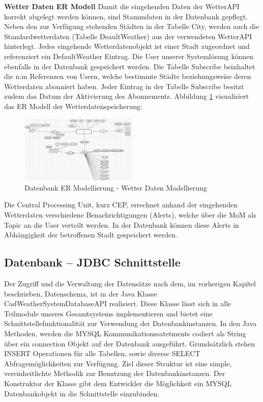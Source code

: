 \textbf{Wetter Daten ER Modell}
Damit die eingehenden Daten der WetterAPI  korrekt abgelegt werden können, sind Stammdaten in der Datenbank gepflegt. Neben den zur Verfügung stehenden Städten in der Tabelle City, werden auch die Standardwetterdaten (Tabelle DeaultWeather) aus der verwendeten WetterAPI hinterlegt. Jedes eingehende  Wetterdatenobjekt ist einer Stadt zugeordnet und referenziert ein DefaultWeather Eintrag.
Die User unserer Systemlösung können ebenfalls in der Datenbank gespeichert werden. Die Tabelle Subscribe beinhaltet die n:m Referenzen von Usern, welche bestimmte Städte beziehungsweise deren Wetterdaten abonniert haben. Jeder Eintrag in der Tabelle Subscribe besitzt zudem das Datum der Aktivierung des Abonnements. Abbildung \ref{img:DBSchemaWetterDaten} visualisiert das ER Modell der Wetterdatenspeicherung:
\begin{figure}[htbp]
	\centering
	\includegraphics[width=0.5\textwidth]{Bilder/DBWetterDaten.png}
	\caption{Datenbank ER Modellierung - Wetter Daten Modellierung}
	\label{img:DBSchemaWetterDaten}
\end{figure} 
Die Central Processing Unit, kurz CEP, errechnet anhand der eingehenden Wetterdaten verschiedene Benachrichtigungen (Alerts), welche über die MoM als Topic an die User verteilt werden. In der Datenbank können diese Alerts in Abhängigkeit der betroffenen Stadt gespeichert werden.

\subsection{Datenbank – JDBC Schnittstelle}
Der Zugriff und die Verwaltung der Datensätze nach dem, im vorherigen Kapitel beschrieben, Datenschema, ist in der Java Klasse  CadWeatherSystemDatabaseAPI realisiert. Diese Klasse lässt sich in alle Teilmodule unseres Gesamtsystems implementieren und bietet eine Schnittstellefunktionalität zur Verwendung der Datenbankinstanzen. In den Java Methoden, werden die MYSQL Kommunikationssatetments codiert als String über ein connection Objekt auf der Datenbank ausgeführt. Grundsätzlich stehen INSERT Operationen für alle Tabellen, sowie diverse SELECT Abfragemöglichkeiten zur Verfügung. Ziel dieser Struktur ist eine simple, vereinheitlichte Methodik zur Benutzung der Datenbankinstanzen.
Der Konstruktor der Klasse gibt dem Entwickler die Möglichkeit ein MYSQL Datenbankobjekt in die Schnittstelle einzubinden.

